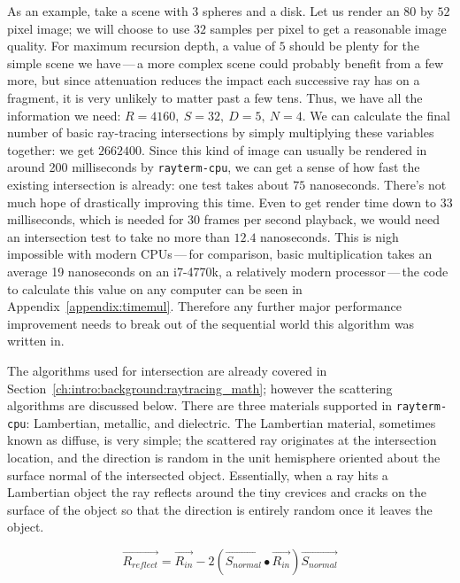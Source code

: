As an example, take a scene with $3$ spheres and a disk.
Let us render an $80$ by $52$ pixel image;
we will choose to use $32$ samples per pixel to get a reasonable image quality.
For maximum recursion depth, a value of $5$ should be plenty for the simple scene we have\,---\,a more complex scene could probably benefit from a few more, but since attenuation reduces the impact each successive ray has on a fragment, it is very unlikely to matter past a few tens.
Thus, we have all the information we need: $R = 4160,\ S = 32,\ D = 5,\ N = 4$.
We can calculate the final number of basic ray-tracing intersections by simply multiplying these variables together: we get $2662400$.
Since this kind of image can usually be rendered in around 200 milliseconds by \texttt{rayterm-cpu}, we can get a sense of how fast the existing intersection is already: one test takes about $75$ nanoseconds.
There's not much hope of drastically improving this time.
Even to get render time down to $33$ milliseconds, which is needed for $30$ frames per second playback, we would need an intersection test to take no more than $12.4$ nanoseconds.
This is nigh impossible with modern CPUs\,---\,for comparison, basic multiplication takes an average 19 nanoseconds on an i7-4770k, a relatively modern processor\,---\,the code to calculate this value on any computer can be seen in Appendix~\ref{appendix:timemul}.
Therefore any further major performance improvement needs to break out of the sequential world this algorithm was written in.

The algorithms used for intersection are already covered in Section~\ref{ch:intro:background:raytracing_math}; however the scattering algorithms are discussed below.
There are three materials supported in \texttt{rayterm-cpu}: Lambertian, metallic, and dielectric.
The Lambertian material, sometimes known as diffuse, is very simple; the scattered ray originates at the intersection location, and the direction is random in the unit hemisphere oriented about the surface normal of the intersected object.
Essentially, when a ray hits a Lambertian object the ray reflects around the tiny crevices and cracks on the surface of the object so that the direction is entirely random once it leaves the object.

\begin{equation}
\label{equation:reflection}
  \vec{R_{reflect}} = \vec{R_{in}} - 2(\vec{S_{normal}} \bullet \vec{R_{in}})\vec{S_{normal}}
\end{equation}

